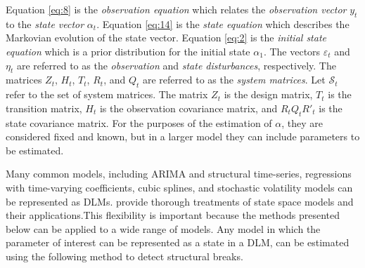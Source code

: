 \documentclass{article}
\begin{document}
Equation \eqref{eq:8} is the \textit{observation equation} which relates the \textit{observation vector} $y_{t}$ to the \textit{state vector} $\alpha_{t}$.
Equation \eqref{eq:14} is the \textit{state equation} which describes the Markovian evolution of the state vector.
Equation \eqref{eq:2} is the \textit{initial state equation} which is a prior distribution for the initial state $\alpha_{1}$.
The vectors $\varepsilon_{t}$ and $\eta_{t}$ are referred to as the \textit{observation} and \textit{state disturbances}, respectively.
The matrices $Z_{t}$, $H_{t}$, $T_{t}$, $R_{t}$, and $Q_{t}$ are referred to as the \textit{system matrices}.
Let $\mathcal{S}_{t}$ refer to the set of system matrices.
The matrix $Z_{t}$ is the design matrix, $T_{t}$ is the transition matrix, $H_{t}$ is the observation covariance matrix, and $R_{t} Q_{t} R'_{t}$ is the state covariance matrix.
For the purposes of the estimation of $\alpha$, they are considered fixed and known, but in a larger model they can include parameters to be estimated.

Many common models, including ARIMA and structural time-series, regressions with time-varying coefficients, cubic splines, and stochastic volatility models can be represented as DLMs. 
\textcites{WestHarrison1997}{DurbinKoopman2001}{CommandeurKoopman2007}{PetrisPetroneEtAl2009}{ShumwayStoffer2010} provide thorough treatments of state space models and their applications.This flexibility is important because the methods presented below can be applied to a wide range of models.
Any model in which the parameter of interest can be represented as a state in a DLM, can be estimated using the following method to detect structural breaks.
\end{document}
